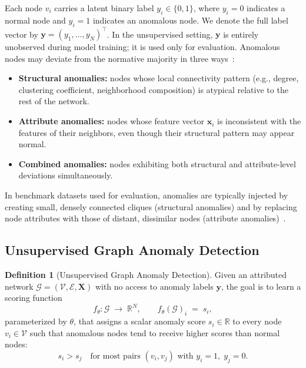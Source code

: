 \documentclass[a4paper]{cas-dc}
\theoremstyle{definition}
\newtheorem{definition}{Definition}
\begin{document}
Each node $v_i$ carries a latent binary label $y_i \in \{0, 1\}$, where $y_i = 0$ indicates a {normal} node and $y_i = 1$ indicates an {anomalous} node.  We denote the full label vector by $\mathbf{y} = (y_1, \ldots, y_N)^\top$.  In the unsupervised setting, $\mathbf{y}$ is {entirely unobserved} during model training; it is used only for evaluation.  Anomalous nodes may deviate from the normative majority in three ways~\cite{ding2019dominant,liu2022cola}:
\begin{itemize}
    \item \textbf{Structural anomalies:} nodes whose local connectivity pattern (e.g., degree, clustering coefficient, neighborhood composition) is atypical relative to the rest of the network.
    \item \textbf{Attribute anomalies:} nodes whose feature vector $\mathbf{x}_i$ is inconsistent with the features of their neighbors, even though their structural pattern may appear normal.
    \item \textbf{Combined anomalies:} nodes exhibiting both structural and attribute-level deviations simultaneously.
\end{itemize}
In benchmark datasets used for evaluation, anomalies are typically injected by creating small, densely connected cliques (structural anomalies) and by replacing node attributes with those of distant, dissimilar nodes (attribute anomalies)~\cite{ding2019dominant,liu2022cola}.

\subsection{Unsupervised Graph Anomaly Detection}
\label{sec:prob_gad}

\begin{definition}[Unsupervised Graph Anomaly Detection]
\label{def:gad}
Given an attributed network $\mathcal{G} = (\mathcal{V}, \mathcal{E}, \mathbf{X})$ with no access to anomaly labels $\mathbf{y}$, the goal is to learn a {scoring function}
\begin{equation}
\label{eq:scoring}
    f_\theta : \mathcal{G} \;\longrightarrow\; \mathbb{R}^N, \qquad
    f_\theta(\mathcal{G})_i \;=\; s_i,
\end{equation}
parameterized by $\theta$, that assigns a scalar anomaly score $s_i \in \mathbb{R}$ to every node $v_i \in \mathcal{V}$ such that anomalous nodes tend to receive higher scores than normal nodes:
\begin{equation}
\label{eq:ranking}
    s_i > s_j \quad \text{for most pairs } (v_i, v_j) \text{ with } y_i = 1,\; y_j = 0.
\end{equation}
\end{definition}
\end{document}
